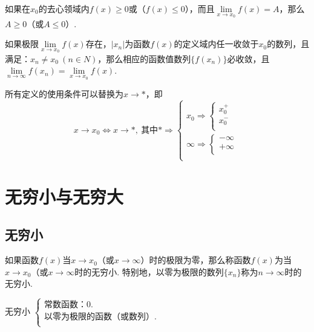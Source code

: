 \begin{corollary}
	如果在\( x_{0} \)的去心领域内\( f(x) \geqslant 0 \)或（\( f(x) \leqslant 0 \)），而且\( \lim\limits_{x \to x_{0}}f(x) = A \)，那么\( A \geqslant 0 \)（或\( A \leqslant 0 \)）.
\end{corollary}

\begin{theorem}[函数极限与数列极限的关系]
	如果极限\( \lim\limits_{x \to x_{0}}f(x) \)存在，\( |x_{n}| \)为函数\( f(x) \)的定义域内任一收敛于\( x_{0} \)的数列，且满足：\( x_{n} \neq x_{0}\ (n \in N) \)，那么相应的函数值数列\( \{f(x_{n})\} \)必收敛，且\( \lim\limits_{n \to \infty}f(x_{n}) = \lim\limits_{x \to x_{0}}f(x) \).
\end{theorem}

\begin{note}
	所有定义的使用条件可以替换为\( x \to * \)，即\\
	\[ x \to x_{0} \Leftrightarrow x \to *,\ \text{其中}* \Rightarrow
	\begin{cases*}
		x_{0} \Rightarrow \begin{cases*}
			x_{0}^{+} \\
			x_{0}^{-} \\
		\end{cases*} \\
		\infty \Rightarrow \begin{cases*}
			-\infty \\
			+\infty \\
		\end{cases*} \\
	\end{cases*} \]
\end{note}

\section{无穷小与无穷大}
\subsection{无穷小}

\begin{definition}[无穷小]
	如果函数\( f(x) \)当\( x \to x_{0} \)（或\( x \to \infty \)）时的极限为零，那么称函数\( f(x) \)为当\( x \to x_{0} \)（或\( x \to \infty \)时的无穷小.
	特别地，以零为极限的数列\( \{x_{n}\} \)称为\( n \to \infty \)时的无穷小.
\end{definition}

\begin{note}
	无穷小
	\( \begin{cases}
		\text{常数函数：}0. \\
		\text{以零为极限的函数（或数列）}. \\
	\end{cases} \)
\end{note}

